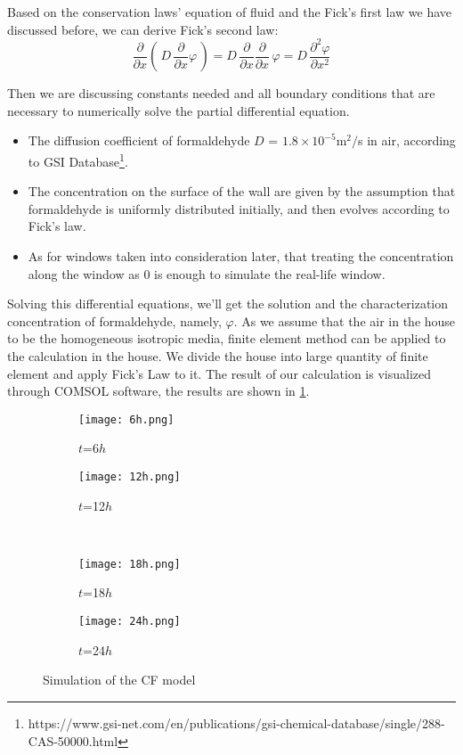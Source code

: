 \documentclass{mcmthesis}
\begin{document}
Based on the conservation laws' equation of fluid and the Fick's first law we have discussed before, we can derive Fick's second law:
\begin{equation}
\frac{\partial}{\partial x}\left(\,D\,{\frac {\partial }{\partial x}}\varphi \,\right)=D\,{\frac {\partial }{\partial x}}{\frac {\partial }{\partial x}}\,\varphi =D\,{\frac {\partial ^{2}\varphi }{\partial x^{2}}}
\end{equation}

Then we are discussing constants needed and all boundary conditions that are necessary to numerically solve the partial differential equation.
\begin{itemize}
	\item The diffusion coefficient of formaldehyde $D$ = $1.8\times 10^{-5}$m$^2/$s in air, according to GSI Database\footnote{https://www.gsi-net.com/en/publications/gsi-chemical-database/single/288-CAS-50000.html}.
	\item The concentration on the surface of the wall are given by the assumption that formaldehyde is uniformly distributed initially, and then evolves according to Fick's law.
    \item As for windows taken into consideration later, that treating the concentration along the window as $0$ is enough to simulate the real-life window.
\end{itemize}
Solving this differential equations, we'll get the solution and the characterization concentration of formaldehyde, namely, $\varphi$. As we assume that the air in the house to be the homogeneous isotropic media, finite element method can be applied to the calculation in the house. We divide the house into large quantity of finite element and apply Fick's Law to it. The result of our calculation is visualized through COMSOL software, the results are shown in \ref{fig:CF}.

\begin{figure}[H]
  \centering
  \begin{subfigure}[b]{0.48\linewidth}
    \texttt{[image: 6h.png]}
    \caption{$t$=6$h$}
  \end{subfigure}
  \begin{subfigure}[b]{0.48\linewidth}
    \texttt{[image: 12h.png]}
    \caption{$t$=12$h$}
  \end{subfigure}\\
  \begin{subfigure}[b]{0.48\linewidth}
    \texttt{[image: 18h.png]}
    \caption{$t$=18$h$}
  \end{subfigure}
  \begin{subfigure}[b]{0.48\linewidth}
    \texttt{[image: 24h.png]}
    \caption{$t$=24$h$}
  \end{subfigure}
  \caption{Simulation of the CF model}
  \label{fig:CF}
\end{figure}
\end{document}
